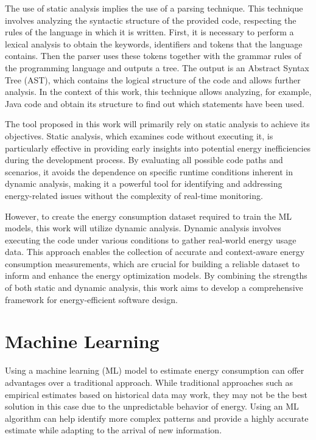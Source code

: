 The use of static analysis implies the use of a parsing technique. This technique involves analyzing the syntactic structure of the provided code, respecting the rules of the language in which it is written. First, it is necessary to perform a lexical analysis to obtain the keywords, identifiers and tokens that the language contains. Then the parser uses these tokens together with the grammar rules of the programming language and outputs a tree. The output is an Abstract Syntax Tree (AST), which contains the logical structure of the code and allows further analysis. In the context of this work, this technique allows analyzing, for example, Java code and obtain its structure to find out which statements have been used.


The tool proposed in this work will primarily rely on static analysis to achieve its objectives. Static analysis, which examines code without executing it, is particularly effective in providing early insights into potential energy inefficiencies during the development process. By evaluating all possible code paths and scenarios, it avoids the dependence on specific runtime conditions inherent in dynamic analysis, making it a powerful tool for identifying and addressing energy-related issues without the complexity of real-time monitoring.

However, to create the energy consumption dataset required to train the ML models, this work will utilize dynamic analysis. Dynamic analysis involves executing the code under various conditions to gather real-world energy usage data. This approach enables the collection of accurate and context-aware energy consumption measurements, which are crucial for building a reliable dataset to inform and enhance the energy optimization models. By combining the strengths of both static and dynamic analysis, this work aims to develop a comprehensive framework for energy-efficient software design.


\section{Machine Learning} \label{sec:background_machine_learning}

Using a machine learning (ML) model to estimate energy consumption can offer advantages over a traditional approach. While traditional approaches such as empirical estimates based on historical data may work, they may not be the best solution in this case due to the unpredictable behavior of energy. Using an ML algorithm can help identify more complex patterns and provide a highly accurate estimate while adapting to the arrival of new information.

